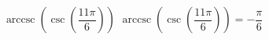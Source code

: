  {$\operatorname{arccsc}\left(\csc\left(\dfrac{11\pi}{6}\right) \right)$ }
{ $\operatorname{arccsc}\left(\csc\left(\dfrac{11\pi}{6}\right) \right) = -\dfrac{\pi}{6}$}
